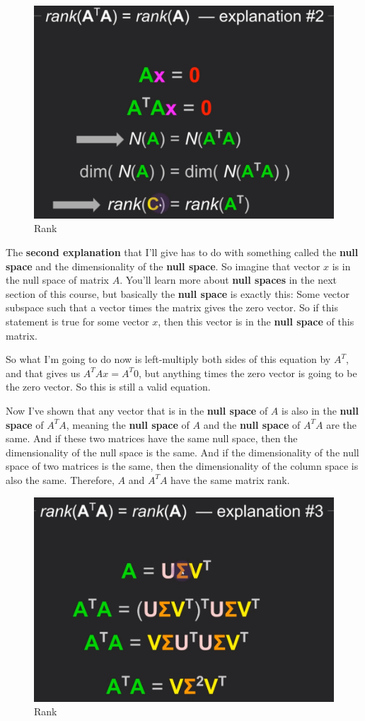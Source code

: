 \documentclass[fleqn,10pt]{olplainarticle}
\theoremstyle{definition}
\theoremstyle{remark}
\begin{document}
\begin{figure}[ht]
	\centering
	\includegraphics[width=0.5\linewidth]{images/rank-24.png}
	\caption{Rank}
	\label{fig:rank_24}
\end{figure}

The \textbf{second explanation} that I'll give has to do with something called the \textbf{null space} and the dimensionality of the \textbf{null space}. So imagine that vector $x$ is in the null space of matrix $A$. You'll learn more about \textbf{null spaces} in the next section of this course, but basically the \textbf{null space} is exactly this: Some vector subspace such that a vector times the matrix gives the zero vector. So if this statement is true for some vector $x$, then this vector is in the \textbf{null space} of this matrix. 

So what I'm going to do now is left-multiply both sides of this equation by $A^T$, and that gives us $A^TAx = A^T0$, but anything times the zero vector is going to be the zero vector. So this is still a valid equation.

Now I've shown that any vector that is in the \textbf{null space} of $A$ is also in the \textbf{null space} of $A^TA$, meaning the \textbf{null space} of $A$ and the \textbf{null space} of $A^TA$ are the same. And if these two matrices have the same null space, then the dimensionality of the null space is the same. And if the dimensionality of the null space of two matrices is the same, then the dimensionality of the column space is also the same. Therefore, $A$ and $A^TA$ have the same matrix rank.

\begin{figure}[ht]
	\centering
	\includegraphics[width=0.5\linewidth]{images/rank-25.png}
	\caption{Rank}
	\label{fig:rank_25}
\end{figure}
\end{document}
